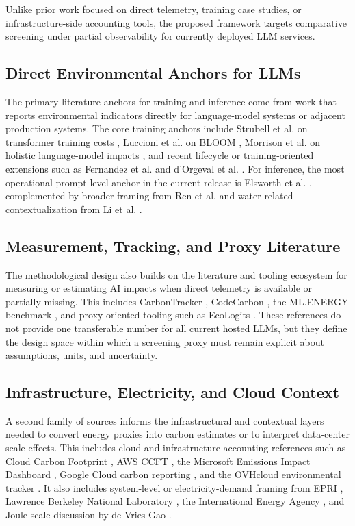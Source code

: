 \documentclass[runningheads]{llncs}
\begin{document}
Unlike prior work focused on direct telemetry, training case studies, or infrastructure-side accounting tools, the proposed framework targets comparative screening under partial observability for currently deployed LLM services.

\subsection{Direct Environmental Anchors for LLMs}
The primary literature anchors for training and inference come from work that reports environmental indicators directly for language-model systems or adjacent production systems. The core training anchors include Strubell et al. on transformer training costs \cite{strubell2019}, Luccioni et al. on BLOOM \cite{luccioni2023}, Morrison et al. on holistic language-model impacts \cite{morrison2025}, and recent lifecycle or training-oriented extensions such as Fernandez et al. \cite{fernandez2025lca} and d'Orgeval et al. \cite{dorgeval2026}. For inference, the most operational prompt-level anchor in the current release is Elsworth et al. \cite{elsworth2025}, complemented by broader framing from Ren et al. \cite{ren2024} and water-related contextualization from Li et al. \cite{li2025water}.

\subsection{Measurement, Tracking, and Proxy Literature}
The methodological design also builds on the literature and tooling ecosystem for measuring or estimating AI impacts when direct telemetry is available or partially missing. This includes CarbonTracker \cite{anthony2020carbontracker}, CodeCarbon \cite{codecarbon2026}, the ML.ENERGY benchmark \cite{mlenergy2025}, and proxy-oriented tooling such as EcoLogits \cite{ecologits2026}. These references do not provide one transferable number for all current hosted LLMs, but they define the design space within which a screening proxy must remain explicit about assumptions, units, and uncertainty.

\subsection{Infrastructure, Electricity, and Cloud Context}
A second family of sources informs the infrastructural and contextual layers needed to convert energy proxies into carbon estimates or to interpret data-center scale effects. This includes cloud and infrastructure accounting references such as Cloud Carbon Footprint \cite{cloudcarbonfootprint2026}, AWS CCFT \cite{awsccft2026}, the Microsoft Emissions Impact Dashboard \cite{azureeid2026}, Google Cloud carbon reporting \cite{gcloudcarbon2026}, and the OVHcloud environmental tracker \cite{ovhtracker2024}. It also includes system-level or electricity-demand framing from EPRI \cite{epri2024}, Lawrence Berkeley National Laboratory \cite{lbl2025,shehabi2024report}, the International Energy Agency \cite{iea2025}, and Joule-scale discussion by de Vries-Gao \cite{devriesgao2025joule}.
\end{document}
